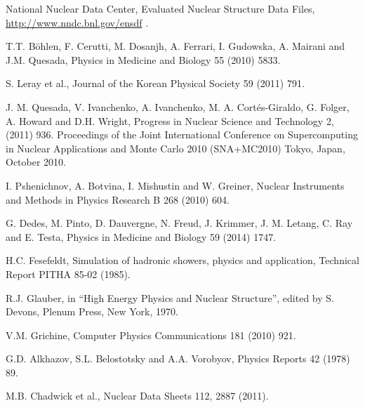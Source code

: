  National Nuclear Data Center,
                       Evaluated Nuclear Structure Data Files,
                       \url{http://www.nndc.bnl.gov/ensdf} .

 T.T. B\"{o}hlen, F. Cerutti, M. Dosanjh, A. Ferrari, I. Gudowska,
                                   A. Mairani and J.M. Quesada,
                                   Physics in Medicine and Biology 55 (2010) 5833.

 S. Leray et al.,
                                    Journal of the Korean Physical Society 59 (2011) 791.

 J. M. Quesada, V. Ivanchenko, A. Ivanchenko,
                                 M. A. Cort\'es-Giraldo, G. Folger, A. Howard and D.H. Wright,
  Progress in Nuclear Science and Technology 2, (2011) 936.
  Proceedings of the Joint International Conference on Supercomputing in Nuclear
  Applications and Monte Carlo 2010 (SNA+MC2010) Tokyo, Japan, October 2010.

 I. Pshenichnov, A. Botvina, I. Mishustin
                                    and W. Greiner,
                                    Nuclear Instruments and Methods in Physics Research B 268 (2010) 604.

 G. Dedes, M. Pinto, D. Dauvergne, N. Freud, J. Krimmer,
                                   J. M. Letang, C. Ray and E. Testa,
                                   Physics in Medicine and Biology 59 (2014) 1747.


 H.C. Fesefeldt, Simulation of hadronic showers, physics and application,
                         Technical Report PITHA 85-02 (1985).

 R.J. Glauber, in ``High Energy Physics and Nuclear
                           Structure'', edited by S. Devons, Plenum Press,
                           New York, 1970.

 V.M. Grichine, Computer Physics Communications 181 (2010) 921.

 G.D. Alkhazov, S.L. Belostotsky and A.A. Vorobyov,
                        Physics Reports 42 (1978) 89.


 M.B. Chadwick et al.,
                      Nuclear Data Sheets 112, 2887 (2011).

